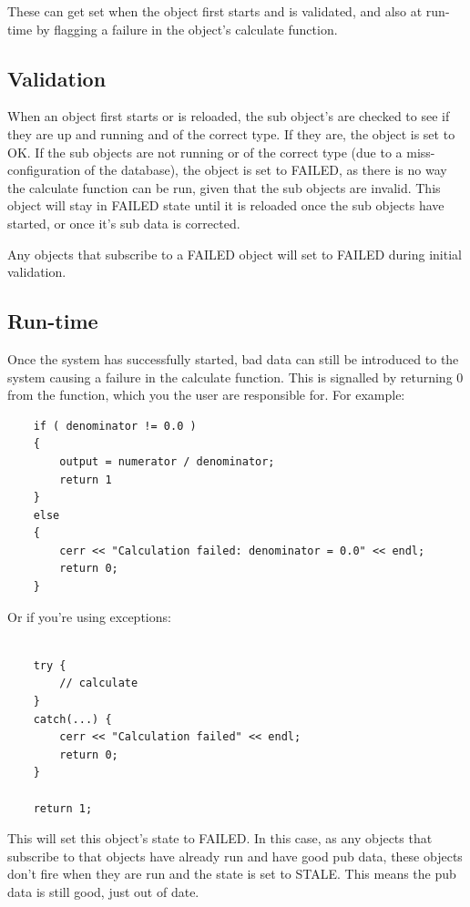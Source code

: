 \documentclass{report}
\begin{document}
These can get set when the object first starts and is validated, and also at run-time by flagging a failure in the object's calculate function.

\subsection{Validation}

When an object first starts or is reloaded, the sub object's are checked to see if they are up and running and of the correct type. If they are, the object is set to OK. If the sub objects are not running or of the correct type (due to a miss-configuration of the database), the object is set to FAILED, as there is no way the calculate function can be run, given that the sub objects are invalid. This object will stay in FAILED state until it is reloaded once the sub objects have started, or once it's sub data is corrected.

Any objects that subscribe to a FAILED object will set to FAILED during initial validation. 

\subsection{Run-time}

Once the system has successfully started, bad data can still be introduced to the system causing a failure in the calculate function. This is signalled by returning 0 from the function, which you the user are responsible for. For example:

\begin{verbatim}
    if ( denominator != 0.0 )
    {
        output = numerator / denominator;
        return 1
    }
    else
    {
        cerr << "Calculation failed: denominator = 0.0" << endl;
        return 0;   
    }
\end{verbatim}

Or if you're using exceptions:

\begin{verbatim}

    try {
        // calculate
    }
    catch(...) {
        cerr << "Calculation failed" << endl;
        return 0;
    }
    
    return 1;
\end{verbatim}

This will set this object's state to FAILED. In this case, as any objects that subscribe to that objects have already run and have good pub data, these objects don't fire when they are run and the state is set to STALE. This means the pub data is still good, just out of date.
\end{document}
